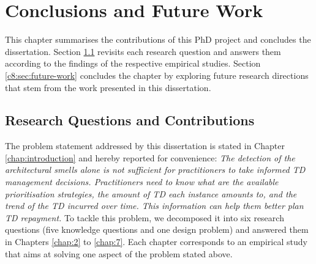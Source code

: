 \setlength{\headheight}{1.2cm}
\renewcommand{\publ}{\flushleft\footnotesize{}}

\chapter{Conclusions and Future Work}\label{chap:8}
This chapter summarises the contributions of this PhD project and concludes the dissertation.
Section \ref{c8:sec:rq-contributions} revisits each research question and answers them according to the findings of the respective empirical studies.
Section \ref{c8:sec:future-work} concludes the chapter by exploring future research directions that stem from the work presented in this dissertation.

\section{Research Questions and Contributions}\label{c8:sec:rq-contributions}
The problem statement addressed by this dissertation is stated in Chapter \ref{chap:introduction} and hereby reported for convenience: \textit{The detection of the architectural smells alone is not sufficient for practitioners to take informed TD management decisions. Practitioners need to know what are the available prioritisation strategies, the amount of TD each instance amounts to, and the trend of the TD incurred over time. This information can help them better plan TD repayment.}
To tackle this problem, we decomposed it into six research questions (five knowledge questions and one design problem) and answered them in Chapters \ref{chap:2} to \ref{chap:7}.
Each chapter corresponds to an empirical study that aims at solving one aspect of the problem stated above.

